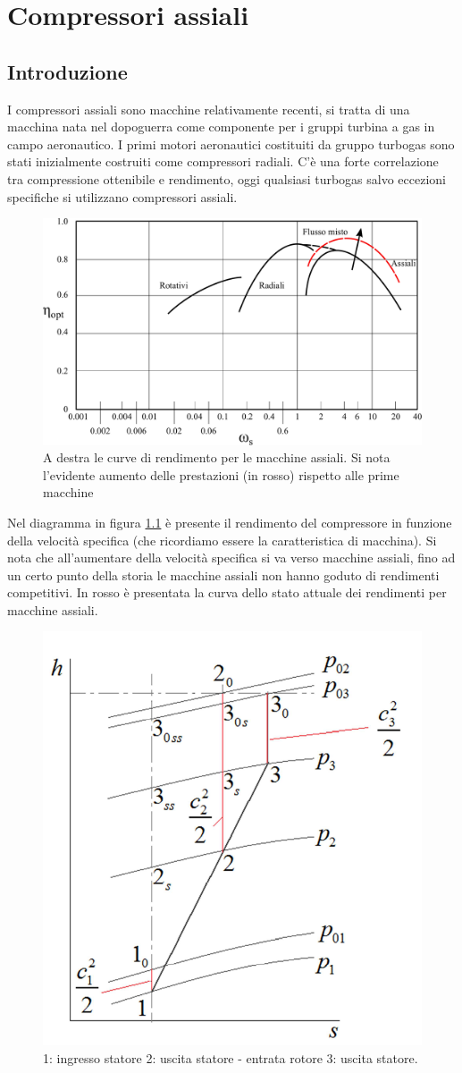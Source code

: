 \chapter{Compressori assiali}

\section{Introduzione}
I compressori assiali sono macchine relativamente recenti, si tratta di una macchina nata nel dopoguerra come componente per i gruppi turbina a gas in campo aeronautico. I primi motori aeronautici costituiti da gruppo turbogas sono stati inizialmente costruiti come compressori radiali. C'è una forte correlazione tra compressione ottenibile e rendimento, oggi qualsiasi turbogas salvo eccezioni specifiche si utilizzano compressori assiali. 
\begin{figure}[h!]
\centering
  \includegraphics[width=.8\textwidth]{fig/PrestComp.pdf}
\caption{A destra le curve di rendimento per le macchine assiali. Si nota l'evidente aumento delle prestazioni (in rosso) rispetto alle prime macchine}
\label{fig:PrestComp}
\end{figure}
Nel diagramma in figura \ref{fig:PrestComp} è presente il rendimento del compressore in funzione della velocità specifica (che ricordiamo essere la caratteristica di macchina). Si nota che all'aumentare della velocità specifica si va verso macchine assiali, fino ad un certo punto della storia le macchine assiali non hanno goduto di rendimenti competitivi. In rosso è presentata la curva dello stato attuale dei rendimenti per macchine assiali. 
\begin{figure}
\centering
  \includegraphics[width=.5\textwidth]{fig/hsComp.png}
\caption{1: ingresso statore 2: uscita statore - entrata rotore 3: uscita statore.}
\label{fig:hsComp}
\end{figure}

